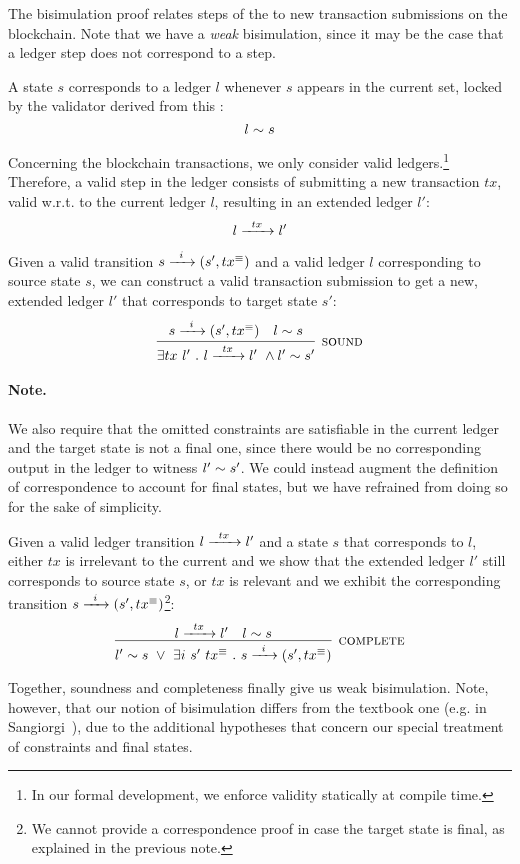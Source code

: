 The bisimulation proof relates steps of the \CEM{} to new transaction
submissions on the blockchain.  Note that we have a \textit{weak}
bisimulation, since it may be the case that a ledger step does not
correspond to a \CEM{} step.

\begin{definition}
A \CEM{} state $s$ corresponds to a ledger $l$ whenever $s$ appears
in the current \UTXO{} set,
locked by the validator derived from this \CEM{}:
\[
 l \sim s 
\]
\end{definition}

\begin{definition}
Concerning the blockchain transactions, we only consider valid
ledgers.\footnote{ In our formal development, we enforce validity
  statically at compile time.  }  Therefore, a valid step in the
ledger consists of submitting a new transaction $tx$,
valid w.r.t. to the current ledger $l$,
resulting in an extended ledger $l'$:
\[
 l \xrightarrow{\hspace{5pt} tx \hspace{5pt}} l' 
\]
\end{definition}

\begin{proposition}[Soundness]
Given a valid \CEM{} transition $ s \xrightarrow{\hspace{5pt} i \hspace{5pt}} (s' , tx^\equiv) $ and a valid ledger
$l$ corresponding to source state $s$, we can construct a valid
transaction submission to get a new, extended ledger $l'$ that
corresponds to target state $s'$:
\[
\infer[\textsc{sound}]
  {\exists tx\ l'\ .\ \LStep{l}{tx}\ \wedge \Sim{l'}{s'}}
  {%
    \CStep{s}{i}{\txeq}
  & \Sim{l}{s}
  }
\]
\end{proposition}

\paragraph{Note.}
We also require that the omitted constraints are satisfiable in the
current ledger and the target state is not a final one, since there
would be no corresponding output in the ledger to witness
$ l' \sim s' $.  We could instead augment the definition of
correspondence to account for final states, but we have refrained from
doing so for the sake of simplicity.

\begin{proposition}[Completeness]
Given a valid ledger transition $ l \xrightarrow{\hspace{5pt} tx \hspace{5pt}} l' $ and a \CEM{} state $s$
that corresponds to $l$, either $tx$ is irrelevant to the current \CEM{}
and we show that the extended ledger $l'$ still corresponds to source
state $s$, or $tx$ is relevant and we exhibit the corresponding \CEM{}
transition $ s \xrightarrow{\hspace{5pt} i \hspace{5pt}} (s' , tx^\equiv) $\footnote{ We cannot provide a
  correspondence proof in case the target state is final, as explained
  in the previous note.  }:
\[
\infer[\textsc{complete}]
  { \Sim{l'}{s}\ \vee\ \exists i\ s'\ \txeq\ .\ \CStep{s}{i}{\txeq} }
  { \LStep{l}{tx}
  & \Sim{l}{s}
  }
\]
\end{proposition}

Together, soundness and completeness finally give us weak bisimulation.
Note, however, that our notion of bisimulation differs from the textbook one (e.g. in Sangiorgi~\cite{sangiorgi}),
due to the additional hypotheses that concern our special treatment of constraints and final states.
